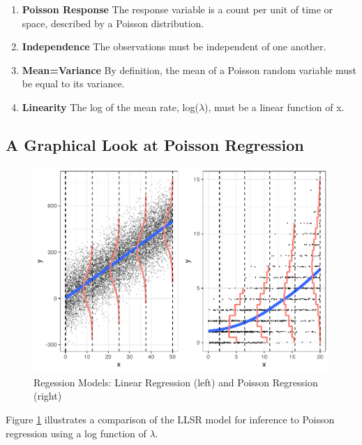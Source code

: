\documentclass[
]{krantz}
\providecommand{\tightlist}{%
  \setlength{\itemsep}{0pt}\setlength{\parskip}{0pt}}
\begin{document}
\begin{enumerate}
\def\labelenumi{\arabic{enumi}.}
\tightlist
\item
  \textbf{Poisson Response} The response variable is a count per unit of time or space, described by a Poisson distribution.
\item
  \textbf{Independence} The observations must be independent of one another.
\item
  \textbf{Mean=Variance} By definition, the mean of a Poisson random variable must be equal to its variance.
\item
  \textbf{Linearity} The log of the mean rate, log(\(\lambda\)), must be a linear function of x.
\end{enumerate}

\hypertarget{a-graphical-look-at-poisson-regression}{%
\subsection{A Graphical Look at Poisson Regression}\label{a-graphical-look-at-poisson-regression}}

\begin{figure}

{\centering \includegraphics[width=0.6\linewidth]{bookdown-BeyondMLR_files/figure-latex/OLSpois-1} 

}

\caption{Regession Models: Linear Regression (left) and Poisson Regression (right)}\label{fig:OLSpois}
\end{figure}

Figure \ref{fig:OLSpois} illustrates a comparison of the LLSR model for inference to Poisson regression using a log function of \(\lambda\).
\end{document}

